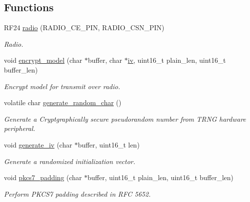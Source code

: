 \subsection*{Functions}
\begin{DoxyCompactItemize}
\item 
\mbox{\label{group___radio__module_gab473f61dd66af21e8f24b4b95dca0222}} 
R\+F24 \mbox{\hyperlink{group___radio__module_gab473f61dd66af21e8f24b4b95dca0222}{radio}} (R\+A\+D\+I\+O\+\_\+\+C\+E\+\_\+\+P\+IN, R\+A\+D\+I\+O\+\_\+\+C\+S\+N\+\_\+\+P\+IN)
\begin{DoxyCompactList}\small\item\em Radio. \end{DoxyCompactList}\item 
void \mbox{\hyperlink{group___radio__module_ga42ee2daa57d1e88e4ca6c712dba5039a}{encrypt\+\_\+model}} (char $\ast$buffer, char $\ast$\mbox{\hyperlink{group___radio__module_ga352378cd7d5875f33dece696475cb8d4}{iv}}, uint16\+\_\+t plain\+\_\+len, uint16\+\_\+t buffer\+\_\+len)
\begin{DoxyCompactList}\small\item\em Encrypt model for transmit over radio. \end{DoxyCompactList}\item 
volatile char \mbox{\hyperlink{group___radio__module_ga7eb1db79bc6e9408f447ffdc65c09aaa}{generate\+\_\+random\+\_\+char}} ()
\begin{DoxyCompactList}\small\item\em Generate a Cryptgraphically secure pseudorandom number from T\+R\+NG hardware peripheral. \end{DoxyCompactList}\item 
void \mbox{\hyperlink{group___radio__module_ga8d208a46c01313ddc1320256e3ce607d}{generate\+\_\+iv}} (char $\ast$buffer, uint16\+\_\+t len)
\begin{DoxyCompactList}\small\item\em Generate a randomized initialization vector. \end{DoxyCompactList}\item 
void \mbox{\hyperlink{group___radio__module_gad2c532e768a8351b48ffcc95dc56e912}{pkcs7\+\_\+padding}} (char $\ast$buffer, uint16\+\_\+t plain\+\_\+len, uint16\+\_\+t buffer\+\_\+len)
\begin{DoxyCompactList}\small\item\em Perform P\+K\+C\+S7 padding described in R\+FC 5652. \end{DoxyCompactList}\item 

\end{DoxyCompactItemize}
